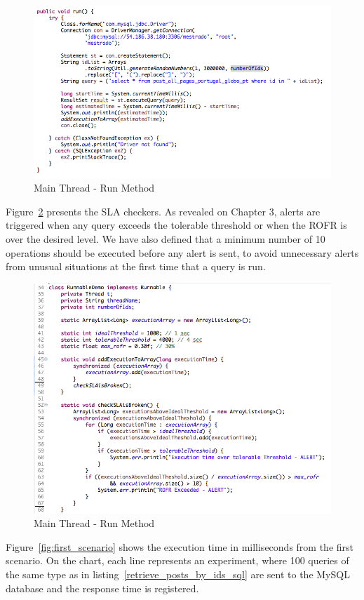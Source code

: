 \begin{figure}[ht!]
\centering
\includegraphics[width=120mm]{Imagens/core-execution-01-2.png}
\caption{Main Thread - Run Method \label{fig:core-execution-01.2}}
\end{figure}


Figure~\ref{fig:core-execution-01.3} presents the SLA checkers. As revealed on Chapter 3, alerts are triggered when any query exceeds the tolerable threshold or when the ROFR is over the desired level. We have also defined that a minimum number of 10 operations should be executed before any alert is sent, to avoid unnecessary alerts from unusual situations at the first time that a query is run.

\begin{figure}[ht!]
\centering
\includegraphics[width=120mm]{Imagens/core-execution-01-3.png}
\caption{Main Thread - Run Method \label{fig:core-execution-01.3}}
\end{figure}


Figure~\ref{fig:first_scenario} shows the execution time in milliseconds from the first scenario. On the chart, each line represents an experiment, where 100 queries of the same type as in listing~\ref{retrieve_posts_by_ids_sql} are sent to the MySQL database and the response time is registered.

